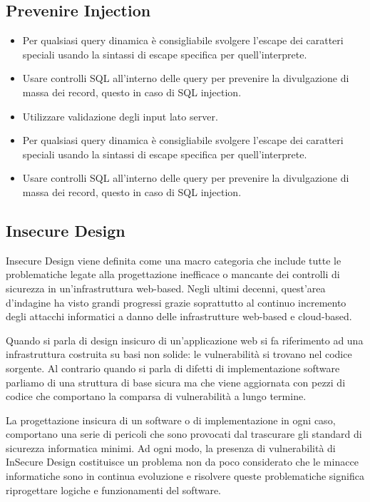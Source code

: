 \subsection{Prevenire Injection} 
\begin{itemize}
    \item Per qualsiasi query dinamica è consigliabile svolgere l'escape dei caratteri speciali usando la sintassi di escape specifica per quell’interprete.
    \item Usare controlli SQL all’interno delle query per prevenire la divulgazione di massa dei record, questo in caso di SQL injection.
    \item Utilizzare validazione degli input lato server.
    \item Per qualsiasi query dinamica è consigliabile svolgere l'escape dei caratteri speciali usando la sintassi di escape specifica per quell’interprete.
    \item Usare controlli SQL all’interno delle query per prevenire la divulgazione di massa dei record, questo in caso di SQL injection.
\end{itemize}
\subsection{Insecure Design}
Insecure Design viene definita come una macro categoria che include tutte le problematiche legate alla progettazione inefficace o mancante dei controlli di sicurezza in un’infrastruttura web-based. Negli ultimi decenni, quest’area d’indagine ha visto grandi progressi grazie soprattutto al continuo incremento degli attacchi informatici a danno delle infrastrutture web-based e cloud-based.

Quando si parla di design insicuro di un’applicazione web si fa riferimento ad una infrastruttura costruita su basi non solide: le vulnerabilità si trovano nel codice sorgente. Al contrario quando si parla di difetti di implementazione software parliamo di una struttura di base sicura ma che viene aggiornata con pezzi di codice che comportano la comparsa di vulnerabilità a lungo termine. 

La progettazione insicura di un software o di implementazione in ogni caso, comportano una serie di pericoli che sono provocati dal trascurare gli standard di sicurezza informatica minimi. Ad ogni modo, la presenza di vulnerabilità di InSecure Design costituisce un problema non da poco considerato che le minacce informatiche sono in continua evoluzione e risolvere queste problematiche significa riprogettare logiche e funzionamenti del software.
